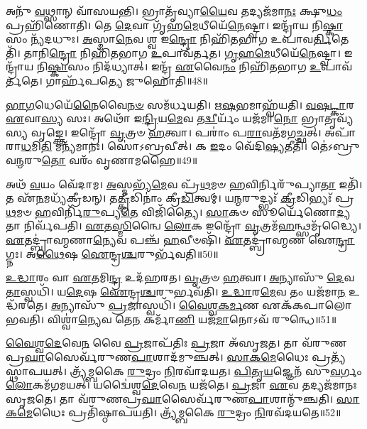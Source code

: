 𑌅𑌨𑍁᳴ \ul{𑌵}\-𑌥𑍍𑌸𑌾𑌨𑍍 𑌵𑌾᳴𑌸𑌯𑌨𑍍𑌤𑌿।
𑌭𑍍𑌰𑌾𑌤𑍃᳴𑌵𑍍𑌯𑌾\-\ul{𑌯𑍈}\-𑌵 𑌤𑌦𑍍𑌯𑌜᳴𑌮𑌾\-\ul{𑌨𑌃} 𑌕𑍍𑌷𑍁\-\ul{𑌧𑌂} 𑌪𑍍𑌰𑌹𑌿᳴𑌣𑍋𑌤𑌿।
𑌤𑍇 \ul{𑌦𑍇}\-𑌵𑌾 𑌗𑍃᳴𑌹\-\ul{𑌮𑍇}\-𑌧𑍀𑌯𑍇᳴\-\ul{𑌨𑍇}\-𑌷𑍍𑌟𑍍𑌵𑌾।
𑌇𑌨𑍍𑌦𑍍𑌰𑌾᳴𑌯 𑌨𑌿\-\ul{𑌷𑍍𑌕𑌾}\-𑌸𑌂 𑌨𑍍𑌯᳴𑌦𑌧𑍁𑌃।
\-\ul{𑌅}\-𑌸𑍍𑌮𑌾\-\ul{𑌨𑍇}\-𑌵 𑌶𑍍𑌵 𑌇\-\ul{𑌨𑍍𑌦𑍍𑌰𑍋} 𑌨𑌿𑌹𑌿᳴𑌤𑌭𑌾𑌗 𑌉𑌪𑌾𑌵\-\ul{𑌰𑍍𑌤𑌿}\-𑌤𑍇𑌤𑌿᳴।
𑌤𑌾𑌨𑌿\-\ul{𑌨𑍍𑌦𑍍𑌰𑍋} 𑌨𑌿𑌹𑌿᳴𑌤𑌭𑌾𑌗 \ul{𑌉}\-𑌪𑌾𑌵᳴𑌰𑍍𑌤𑌤।
\-\ul{𑌗𑍃}\-\-\ul{𑌹}\-\-\ul{𑌮𑍇}\-𑌧𑍀𑌯𑍇᳴\-\ul{𑌨𑍇}\-𑌷𑍍𑌟𑍍𑌵𑌾।
𑌇𑌨𑍍𑌦𑍍𑌰𑌾᳴𑌯 𑌨𑌿\-\ul{𑌷𑍍𑌕𑌾}\-𑌸𑌂 𑌨𑌿𑌦᳴𑌧𑍍𑌯𑌾𑌤𑍍।
𑌇𑌨𑍍𑌦𑍍𑌰᳴ \ul{𑌏}\-𑌵𑍈\-\ul{𑌨𑌂} 𑌨𑌿𑌹𑌿᳴𑌤𑌭𑌾𑌗 \ul{𑌉}\-𑌪𑌾𑌵᳴𑌰𑍍𑌤𑌤𑍇।
𑌗𑌾𑌰𑍍\mbox{}𑌹᳴𑌪𑌤𑍍𑌯𑍇 𑌜𑍁𑌹𑍋𑌤𑌿॥48॥

\-\ul{𑌭𑌾}\-\-\ul{𑌗}\-𑌧𑍇𑌯𑍇᳴\-\ul{𑌨𑍈}\-𑌵𑍈\-\ul{𑌨}\-\-\ul{𑍞} 𑌸𑌮᳴𑌰𑍍𑌧𑌯𑌤𑌿।
\-\ul{𑌋}\-\-\ul{𑌷}\-𑌭𑌮𑌾𑌹𑍍𑌵᳴𑌯𑌤𑌿।
\-\ul{𑌵}\-\-\ul{𑌷}\-\-\ul{𑌟𑍍𑌕𑌾}\-𑌰 \ul{𑌏}\-𑌵𑌾\-\ul{𑌸𑍍𑌯} 𑌸𑌃।
𑌅𑌥𑍋᳴ 𑌇\-\ul{𑌨𑍍𑌦𑍍𑌰𑌿}\-𑌯\-\ul{𑌮𑍇}\-𑌵 𑌤\-\ul{𑌦𑍍𑌵𑍀}\-𑌰𑍍𑌯𑌂᳴ 𑌯𑌜᳴𑌮𑌾\-\ul{𑌨𑍋} 𑌭𑍍𑌰𑌾𑌤𑍃𑌵𑍍𑌯᳴𑌸𑍍𑌯 𑌵𑍃𑌙𑍍𑌕𑍍𑌤𑍇।
𑌇𑌨𑍍𑌦𑍍𑌰𑍋᳴ \ul{𑌵𑍃}\-𑌤𑍍𑌰𑍞 \ul{𑌹}\-𑌤𑍍𑌵𑌾।
𑌪𑌰𑌾𑌂॑ 𑌪\-\ul{𑌰𑌾}\-𑌵𑌤᳴𑌮𑌗𑌚𑍍𑌛𑌤𑍍।
𑌅𑌪𑌾᳴𑌰𑌾\-\ul{𑌧}\-𑌮𑌿\-\ul{𑌤𑌿} 𑌮𑌨𑍍𑌯᳴𑌮𑌾𑌨𑌃।
𑌸𑍋॑𑌽𑌬𑍍𑌰𑌵𑍀𑌤𑍍।
𑌕 \ul{𑌇}\-𑌦𑌂 𑌵𑍇᳴𑌦𑌿\-\ul{𑌷𑍍𑌯}\-𑌤𑍀𑌤𑌿᳴।
𑌤𑍇॑𑌽𑌬𑍍𑌰𑍁𑌵\-\ul{𑌨𑍍𑌮}\-𑌰𑍁\-\ul{𑌤𑍋} 𑌵𑌰𑌂᳴ 𑌵𑍃𑌣𑌾𑌮𑌹𑍈॥49॥

𑌅𑌥᳴ \ul{𑌵}\-𑌯𑌂 𑌵𑍇᳴𑌦𑌾𑌮।
\-\ul{𑌅}\-𑌸𑍍𑌮𑌭𑍍𑌯᳴\-\ul{𑌮𑍇}\-𑌵 𑌪𑍍𑌰᳴\-\ul{𑌥}\-𑌮𑍞 \ul{𑌹}\-𑌵𑌿𑌰𑍍𑌨𑌿𑌰𑍁᳴𑌪𑍍𑌯𑌾\-\ul{𑌤𑌾} 𑌇𑌤𑌿᳴।
𑌤 𑌏᳴\-\ul{𑌨}\-𑌮𑌧𑍍𑌯᳴𑌕𑍍𑌰𑍀𑌡𑌨𑍍।
𑌤\-\ul{𑌤𑍍𑌕𑍍𑌰𑍀}\-𑌡𑌿𑌨𑌾𑌂॑ 𑌕𑍍𑌰𑍀\-\ul{𑌡𑌿}\-𑌤𑍍𑌵𑌮𑍍।
𑌯\-\ul{𑌨𑍍𑌮}\-𑌰𑍁𑌦𑍍𑌭𑍍𑌯𑌃᳴ \ul{𑌕𑍍𑌰𑍀}\-𑌡𑌿𑌭𑍍𑌯𑌃᳴ 𑌪𑍍𑌰\-\ul{𑌥}\-𑌮𑍞 \ul{𑌹}\-𑌵𑌿𑌰𑍍𑌨𑌿᳴\-\ul{𑌰𑍁}\-𑌪𑍍𑌯\-\ul{𑌤𑍇} 𑌵𑌿𑌜𑌿᳴𑌤𑍍𑌯𑍈।
\-\ul{𑌸𑌾}\-𑌕𑍞 𑌸𑍂𑌰𑍍𑌯𑍇᳴𑌣𑍋\-\ul{𑌦𑍍𑌯}\-𑌤𑌾 𑌨𑌿𑌰𑍍𑌵᳴𑌪𑌤𑌿।
\-\ul{𑌏}\-𑌤\-\ul{𑌸𑍍𑌮𑌿}\-𑌨𑍍𑌵𑍈 \ul{𑌲𑍋}\-𑌕 𑌇𑌨𑍍𑌦𑍍𑌰𑍋᳴ \ul{𑌵𑍃}\-𑌤𑍍𑌰𑌮᳴\-\ul{𑌹}\-𑌨𑍍𑌥𑍍𑌸𑌮𑍃᳴𑌦𑍍𑌧𑍍𑌯𑍈।
\-\ul{𑌏}\-𑌤𑌦𑍍𑌬𑍍𑌰𑌾॑𑌹𑍍𑌮𑌣𑌾\-\ul{𑌨𑍍𑌯𑍇}\-𑌵 𑌪𑌞𑍍𑌚᳴ \ul{𑌹}\-𑌵𑍀𑍞𑌷𑌿᳴।
\-\ul{𑌏}\-𑌤𑌦𑍍𑌬𑍍𑌰𑌾॑𑌹𑍍𑌮𑌣 𑌐\-\ul{𑌨𑍍𑌦𑍍𑌰𑌾}\-𑌗𑍍𑌨𑌃।
𑌅\-\ul{𑌥𑍈}\-𑌷 \ul{𑌐}\-𑌨𑍍𑌦𑍍𑌰\-\ul{𑌶𑍍𑌚}\-𑌰𑍁𑌰𑍍𑌭᳴𑌵𑌤𑌿॥50॥

\-\ul{𑌉}\-\-\ul{𑌦𑍍𑌧𑌾}\-𑌰𑌂 𑌵𑌾 \ul{𑌏}\-𑌤𑌮𑌿\-\ul{𑌨𑍍𑌦𑍍𑌰} 𑌉𑌦᳴𑌹𑌰𑌤।
\-\ul{𑌵𑍃}\-𑌤𑍍𑌰𑍞 \ul{𑌹}\-𑌤𑍍𑌵𑌾।
\-\ul{𑌅}\-𑌨𑍍𑌯𑌾𑌸𑍁᳴ \ul{𑌦𑍇}\-𑌵\-\ul{𑌤𑌾}\-𑌸𑍍𑌵𑌧𑌿᳴।
𑌯\-\ul{𑌦𑍇}\-𑌷 \ul{𑌐}\-𑌨𑍍𑌦𑍍𑌰\-\ul{𑌶𑍍𑌚}\-𑌰𑍁𑌰𑍍𑌭𑌵᳴𑌤𑌿।
\-\ul{𑌉}\-\-\ul{𑌦𑍍𑌧𑌾}\-𑌰\-\ul{𑌮𑍇}\-𑌵 𑌤𑌂 𑌯𑌜᳴𑌮𑌾\-\ul{𑌨} 𑌉𑌦𑍍𑌧᳴𑌰𑌤𑍇।
\-\ul{𑌅}\-𑌨𑍍𑌯𑌾𑌸𑍁᳴ \ul{𑌪𑍍𑌰}\-𑌜𑌾𑌸𑍍𑌵𑌧𑌿᳴।
\-\ul{𑌵𑍈}\-\-\ul{𑌶𑍍𑌵}\-\-\ul{𑌕}\-\-\ul{𑌰𑍍𑌮}\-𑌣 𑌏𑌕᳴𑌕𑌪𑌾𑌲𑍋 𑌭𑌵𑌤𑌿।
𑌵𑌿𑌶𑍍𑌵𑌾॑\-\ul{𑌨𑍍𑌯𑍇}\-𑌵 𑌤𑍇\-\ul{𑌨} 𑌕𑌰𑍍𑌮𑌾᳴\-\ul{𑌣𑌿} 𑌯𑌜᳴\-\ul{𑌮𑌾}\-𑌨𑍋\-𑌽𑌵᳴ 𑌰𑍁𑌨𑍍𑌧𑍇॥51॥\anuvakamend[\-\ul{𑌋}\-\-\ul{𑌦𑍍𑌧𑍍𑌯}\-\-\ul{𑌤𑍇}\-\-𑌽𑌭𑍍𑌯᳴𑌞𑍍𑌜𑌤𑍇 𑌜𑍁𑌹𑍋𑌤𑌿 𑌵𑍃𑌣𑌾𑌮𑌹𑍈 𑌭𑌵\-\ul{𑌤𑍍𑌯}\-𑌷𑍍𑌟𑍗 𑌚᳴]

\-\ul{𑌵𑍈}\-\-\ul{𑌶𑍍𑌵}\-\-\ul{𑌦𑍇}\-𑌵𑍇\-\ul{𑌨} 𑌵𑍈 \ul{𑌪𑍍𑌰}\-𑌜𑌾\-𑌪᳴𑌤𑌿𑌃 \ul{𑌪𑍍𑌰}\-𑌜𑌾 𑌅᳴\-𑌸𑍃𑌜𑌤।
𑌤𑌾 𑌵᳴𑌰𑍁𑌣\-𑌪𑍍𑌰\-\ul{𑌘𑌾}\-𑌸𑍈𑌰𑍍𑌵᳴𑌰𑍁𑌣\-\-\ul{𑌪𑌾}\-𑌶𑌾𑌦᳴𑌮𑍁𑌞𑍍𑌚𑌤𑍍।
\-\ul{𑌸𑌾}\-\-\ul{𑌕}\-\-\ul{𑌮𑍇}\-𑌧𑍈𑌃 𑌪𑍍𑌰𑌤𑍍𑌯᳴𑌸𑍍𑌥𑌾𑌪𑌯𑌤𑍍।
𑌤𑍍𑌰𑍍𑌯᳴𑌮𑍍𑌬𑌕𑍈 \ul{𑌰𑍁}\-𑌦𑍍𑌰𑌂 \ul{𑌨𑌿}\-𑌰𑌵𑌾᳴𑌦𑌯𑌤।
\-\ul{𑌪𑌿}\-\-\ul{𑌤𑍃}\-\-\ul{𑌯}\-𑌜𑍍𑌞𑍇𑌨᳴ 𑌸𑍁\-\ul{𑌵}\-𑌰𑍍𑌗𑌂 \ul{𑌲𑍋}\-𑌕𑌮᳴𑌗𑌮𑌯𑌤𑍍।
𑌯𑌦𑍍𑌵𑍈॑𑌶𑍍𑌵\-\ul{𑌦𑍇}\-𑌵𑍇\-\ul{𑌨} 𑌯𑌜᳴𑌤𑍇।
\-\ul{𑌪𑍍𑌰}\-𑌜𑌾 \ul{𑌏}\-𑌵 𑌤𑌦𑍍𑌯𑌜᳴𑌮𑌾𑌨𑌃 𑌸𑍃𑌜𑌤𑍇।
𑌤𑌾 𑌵᳴𑌰𑍁𑌣𑌪𑍍𑌰\-\ul{𑌘𑌾}\-𑌸𑍈𑌰𑍍𑌵᳴𑌰𑍁𑌣\-\ul{𑌪𑌾}\-𑌶𑌾𑌨𑍍𑌮𑍁᳴𑌞𑍍𑌚𑌤𑌿।
\-\ul{𑌸𑌾}\-\-\ul{𑌕}\-\-\ul{𑌮𑍇}\-𑌧𑍈𑌃 𑌪𑍍𑌰𑌤𑌿᳴\-𑌷𑍍𑌠𑌾𑌪𑌯𑌤𑌿।
𑌤𑍍𑌰𑍍𑌯᳴𑌮𑍍𑌬𑌕𑍈 \ul{𑌰𑍁}\-𑌦𑍍𑌰𑌂 \ul{𑌨𑌿}\-𑌰𑌵᳴𑌦𑌯𑌤𑍇॥52॥

